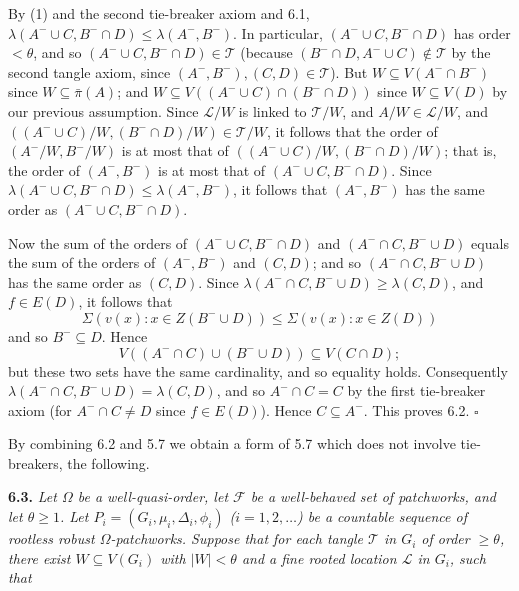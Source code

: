 By (1) and the second tie-breaker axiom and 6.1, $\lambda(A^- \cup C, B^- \cap D) \le \lambda(A^-, B^-)$. In particular, $(A^- \cup C, B^- \cap D)$ has order $< \theta$, and so $(A^- \cup C, B^- \cap D) \in \mathcal{T}$ (because $(B^- \cap D, A^- \cup C) \notin \mathcal{T}$ by the second tangle axiom, since $(A^-, B^-), (C, D) \in \mathcal{T}$). But $W \subseteq V(A^- \cap B^-)$ since $W \subseteq \bar{\pi}(A)$; and $W \subseteq V((A^- \cup C) \cap (B^- \cap D))$ since $W \subseteq V(D)$ by our previous assumption. Since $\mathcal{L}/W$ is linked to $\mathcal{T}/W$, and $A/W \in \mathcal{L}/W$, and $((A^- \cup C)/W, (B^- \cap D)/W) \in \mathcal{T}/W$, it follows that the order of $(A^-/W, B^-/W)$ is at most that of $((A^- \cup C)/W, (B^- \cap D)/W)$; that is, the order of $(A^-, B^-)$ is at most that of $(A^- \cup C, B^- \cap D)$. Since $\lambda(A^- \cup C, B^- \cap D) \le \lambda(A^-, B^-)$, it follows that $(A^-, B^-)$ has the same order as $(A^- \cup C, B^- \cap D)$.

Now the sum of the orders of $(A^- \cup C, B^- \cap D)$ and $(A^- \cap C, B^- \cup D)$ equals the sum of the orders of $(A^-, B^-)$ and $(C, D)$; and so $(A^- \cap C, B^- \cup D)$ has the same order as $(C, D)$. Since $\lambda(A^- \cap C, B^- \cup D) \ge \lambda(C, D)$, and $f \in E(D)$, it follows that
\begin{equation*}
\Sigma(v(x) : x \in Z(B^- \cup D)) \le \Sigma(v(x) : x \in Z(D))
\end{equation*}
and so $B^- \subseteq D$. Hence
\begin{equation*}
V((A^- \cap C) \cup (B^- \cup D)) \subseteq V(C \cap D);
\end{equation*}
but these two sets have the same cardinality, and so equality holds. Consequently $\lambda(A^- \cap C, B^- \cup D) = \lambda(C, D)$, and so $A^- \cap C = C$ by the first tie-breaker axiom (for $A^- \cap C \ne D$ since $f \in E(D)$). Hence $C \subseteq A^-$. This proves 6.2. $\square$

By combining 6.2 and 5.7 we obtain a form of 5.7 which does not involve tie-breakers, the following.

\textbf{6.3.} \textit{Let $\Omega$ be a well-quasi-order, let $\mathcal{F}$ be a well-behaved set of patchworks, and let $\theta \ge 1$. Let $P_i = (G_i, \mu_i, \Delta_i, \phi_i)$ ($i = 1, 2, \ldots$) be a countable sequence of rootless robust $\Omega$-patchworks. Suppose that for each tangle $\mathcal{T}$ in $G_i$ of order $\ge \theta$, there exist $W \subseteq V(G_i)$ with $|W| < \theta$ and a fine rooted location $\mathcal{L}$ in $G_i$, such that}

